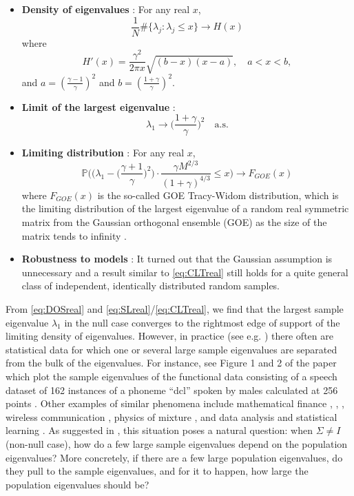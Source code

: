 \documentclass[11pt]{article}
\begin{document}
\begin{itemize}
\item \textbf{Density of eigenvalues} \cite{MP}: For any real $x$,
\begin{equation}\label{eq:DOSreal}
  \frac1{N} \#\{ \lambda_j : \lambda_j\le x\} \to H(x)
\end{equation}
where
\begin{equation}\label{eq:DOSformula}
  H'(x) = \frac{\gamma^2}{2\pi x}\sqrt{(b-x)(x-a)}, \quad a<x<b,
\end{equation}
and $a=(\frac{\gamma-1}{\gamma})^2$ and
$b=(\frac{1+\gamma}{\gamma})^2$.
\item \textbf{Limit of the largest eigenvalue} \cite{Geman}:
\begin{equation}\label{eq:SLreal}
  \lambda_1 \to \biggl(\frac{1+\gamma}{\gamma}\biggr)^2 \quad \text{a.s.}
\end{equation}
\item \textbf{Limiting distribution}
\cite{Johnstone}: For any real $x$,
\begin{equation}\label{eq:CLTreal}
  \mathbb{P} \biggl( \bigr( \lambda_1 - \bigl(\frac{\gamma+1}\gamma \bigr)^2
  \bigr) \cdot
  \frac{\gamma M^{2/3}}{(1+\gamma)^{4/3}} \le x \biggr)
  \to F_{GOE}(x)
\end{equation}
where $F_{GOE}(x)$ is the so-called GOE Tracy-Widom distribution,
which is the limiting distribution of the largest eigenvalue of a
random real symmetric matrix from the Gaussian orthogonal ensemble
(GOE) as the size of the matrix tends to infinity
\cite{TracyWidomGOE}.
\item \textbf{Robustness to models} \cite{Soshnikovcovariance}: It
turned out that the Gaussian assumption is unnecessary and a
result similar to \eqref{eq:CLTreal} still holds for a quite
general class of independent, identically distributed random
samples.
\end{itemize}

From \eqref{eq:DOSreal} and \eqref{eq:SLreal}/\eqref{eq:CLTreal},
we find that the largest sample eigenvalue $\lambda_1$ in the null
case converges to the rightmost edge of support of the limiting
density of eigenvalues. However, in practice (see e.g.
\cite{Johnstone}) there often are statistical data for which one
or several large sample eigenvalues are separated from the bulk of
the eigenvalues. For instance, see Figure 1 and 2 of the paper
\cite{Johnstone} which plot the sample eigenvalues of the
functional data consisting of a speech dataset of 162 instances of
a phoneme ``dcl'' spoken by males calculated at 256 points
\cite{Buja}. Other examples of similar phenomena include
mathematical finance \cite{PlerousGRAGS}, \cite{LalouxCPB},
\cite{MalevergneS}, wireless communication \cite{Telatar}, physics
of mixture \cite{SearC}, and data analysis and statistical
learning \cite{HoyleR}. As suggested in \cite{Johnstone}, this
situation poses a natural question: when $\Sigma\neq I$ (non-null
case), how do a few large sample eigenvalues depend on the
population eigenvalues? More concretely, if there are a few large
population eigenvalues, do they pull to the sample eigenvalues,
and for it to happen, how large the population eigenvalues should
be?
\end{document}
